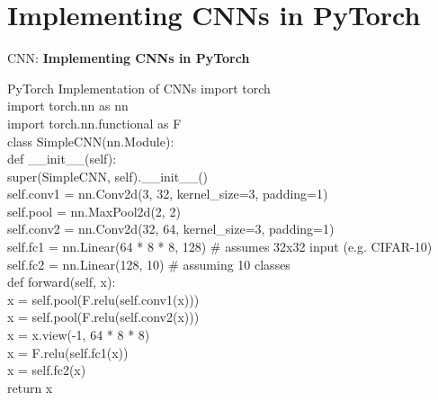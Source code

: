 \section{Implementing CNNs in PyTorch}
\begin{frame}{}
    \LARGE CNN: \textbf{Implementing CNNs in PyTorch}
\end{frame}

\begin{frame}[allowframebreaks]{PyTorch Implementation of CNNs}
    \ttfamily\footnotesize{
    import torch \\
    import torch.nn as nn \\
    import torch.nn.functional as F \\

    class SimpleCNN(nn.Module): \\
    \hspace{1em}    def \_\_init\_\_(self): \\
    \hspace{2em}         super(SimpleCNN, self).\_\_init\_\_() \\
    \hspace{2em}        self.conv1 = nn.Conv2d(3, 32, kernel\_size=3, padding=1) \\
    \hspace{2em}        self.pool = nn.MaxPool2d(2, 2) \\
    \hspace{2em}        self.conv2 = nn.Conv2d(32, 64, kernel\_size=3, padding=1) \\
    \hspace{2em}        self.fc1 = nn.Linear(64 * 8 * 8, 128)  \# assumes 32x32 input (e.g. CIFAR-10) \\
    \hspace{2em}        self.fc2 = nn.Linear(128, 10)  \# assuming 10 classes \\

    \hspace{1em}    def forward(self, x): \\
    \hspace{2em}        x = self.pool(F.relu(self.conv1(x))) \\
    \hspace{2em}        x = self.pool(F.relu(self.conv2(x))) \\
    \hspace{2em}        x = x.view(-1, 64 * 8 * 8) \\
    \hspace{2em}        x = F.relu(self.fc1(x)) \\
    \hspace{2em}        x = self.fc2(x) \\
    \hspace{2em}        return x
    }


\end{frame}
